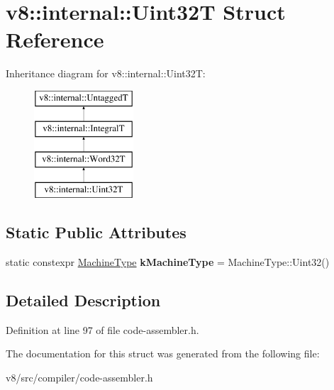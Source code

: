\hypertarget{structv8_1_1internal_1_1Uint32T}{}\section{v8\+:\+:internal\+:\+:Uint32T Struct Reference}
\label{structv8_1_1internal_1_1Uint32T}
Inheritance diagram for v8\+:\+:internal\+:\+:Uint32T\+:\begin{figure}[H]
\begin{center}
\leavevmode
\includegraphics[height=4.000000cm]{structv8_1_1internal_1_1Uint32T}
\end{center}
\end{figure}
\subsection*{Static Public Attributes}
\begin{DoxyCompactItemize}
\item 
\mbox{\label{structv8_1_1internal_1_1Uint32T_a18881ae647652f85f904a4f52026ecd6}} 
static constexpr \mbox{\hyperlink{classv8_1_1internal_1_1MachineType}{Machine\+Type}} {\bfseries k\+Machine\+Type} = Machine\+Type\+::\+Uint32()
\end{DoxyCompactItemize}


\subsection{Detailed Description}


Definition at line 97 of file code-\/assembler.\+h.



The documentation for this struct was generated from the following file\+:\begin{DoxyCompactItemize}
\item 
v8/src/compiler/code-\/assembler.\+h\end{DoxyCompactItemize}
